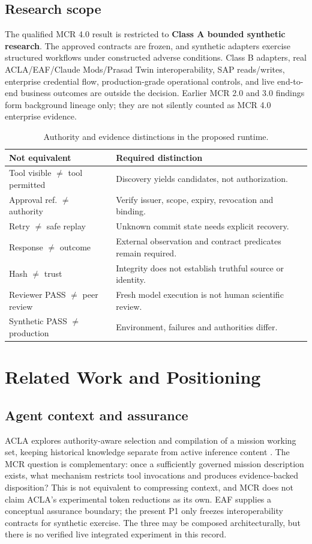 \documentclass[11pt,twocolumn]{article}
\begin{document}
\subsection{Research scope}
The qualified MCR 4.0 result is restricted to \textbf{Class A bounded synthetic research}. The approved contracts are frozen, and synthetic adapters exercise structured workflows under constructed adverse conditions. Class B adapters, real ACLA/EAF/Claude Mods/Prasad Twin interoperability, SAP reads/writes, enterprise credential flow, production-grade operational controls, and live end-to-end business outcomes are outside the decision. Earlier MCR 2.0 and 3.0 findings form background lineage only; they are not silently counted as MCR 4.0 enterprise evidence.

\begin{table}[t]
\centering\caption{Authority and evidence distinctions in the proposed runtime.}
\label{tab:distinctions}
\footnotesize
\begin{tabularx}{\columnwidth}{@{}p{}X@{}}
\toprule
\textbf{Not equivalent} & \textbf{Required distinction}\\\midrule
Tool visible $\neq$ tool permitted & Discovery yields candidates, not authorization.\\
Approval ref. $\neq$ authority & Verify issuer, scope, expiry, revocation and binding.\\
Retry $\neq$ safe replay & Unknown commit state needs explicit recovery.\\
Response $\neq$ outcome & External observation and contract predicates remain required.\\
Hash $\neq$ trust & Integrity does not establish truthful source or identity.\\
Reviewer PASS $\neq$ peer review & Fresh model execution is not human scientific review.\\
Synthetic PASS $\neq$ production & Environment, failures and authorities differ.\\\bottomrule
\end{tabularx}
\end{table}

\section{Related Work and Positioning}
\subsection{Agent context and assurance}
ACLA explores authority-aware selection and compilation of a mission working set, keeping historical knowledge separate from active inference content \cite{deshpandeACLA}. The MCR question is complementary: once a sufficiently governed mission description exists, what mechanism restricts tool invocations and produces evidence-backed disposition? This is not equivalent to compressing context, and MCR does not claim ACLA's experimental token reductions as its own. EAF supplies a conceptual assurance boundary; the present P1 only freezes interoperability contracts for synthetic exercise. The three may be composed architecturally, but there is no verified live integrated experiment in this record.
\end{document}
